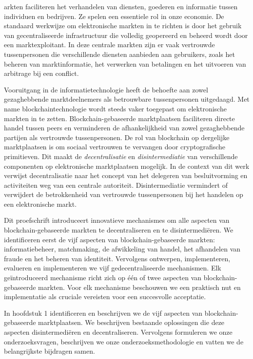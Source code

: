 {

arkten faciliteren het verhandelen van diensten, goederen en informatie tussen individuen en bedrijven.
Ze spelen een essentiele rol in onze economie.
De standaard werkwijze om elektronische markten in te richten is door het gebruik van gecentraliseerde infrastructuur die volledig geopereerd en beheerd wordt door een marktexploitant.
In deze centrale markten zijn er vaak vertrouwde tussenpersonen die verschillende diensten aanbieden aan gebruikers, zoals het beheren van marktinformatie, het verwerken van betalingen en het uitvoeren van arbitrage bij een conflict.

Vooruitgang in de informatietechnologie heeft de behoefte aan zowel gezaghebbende marktdeelnemers als betrouwbare tussenpersonen uitgedaagd.
Met name blockchaintechnologie wordt steeds vaker toegepast om elektronische markten in te zetten.
Blockchain-gebaseerde marktplaatsen faciliteren directe handel tussen peers en verminderen de afhankelijkheid van zowel gezaghebbende partijen als vertrouwde tussenpersonen.
De rol van blockchain op dergelijke marktplaatsen is om sociaal vertrouwen te vervangen door cryptografische primitieven.
Dit maakt de \emph{decentralisatie} en \emph{disintermediatie} van verschillende componenten op elektronische marktplaatsen mogelijk.
In de context van dit werk verwijst decentralisatie naar het concept van het delegeren van besluitvorming en activiteiten weg van een centrale autoriteit.
Disintermediatie vermindert of verwijdert de betrokkenheid van vertrouwde tussenpersonen bij het handelen op een elektronische markt.

Dit proefschrift introduceert innovatieve mechanismes om alle aspecten van blockchain-gebaseerde markten te decentraliseren en te disintermediëren.
We identificeren eerst de vijf aspecten van blockchain-gebaseerde markten: informatiebeheer, matchmaking, de afwikkeling van handel, het afhandelen van fraude en het beheren van identiteit.
Vervolgens ontwerpen, implementeren, evalueren en implementeren we vijf gedecentraliseerde mechanismen.
Elk geïntroduceerd mechanisme richt zich op één of twee aspecten van blockchain-gebaseerde markten.
Voor elk mechanisme beschouwen we een praktisch nut en implementatie als cruciale vereisten voor een succesvolle acceptatie.

In hoofdstuk 1 identificeren en beschrijven we de vijf aspecten van blockchain-gebaseerde marktplaatsen.
We beschrijven bestaande oplossingen die deze aspecten disintermediëren en decentraliseren.
Vervolgens formuleren we onze onderzoeksvragen, beschrijven we onze onderzoeksmethodologie en vatten we de belangrijkste bijdragen samen.

}
